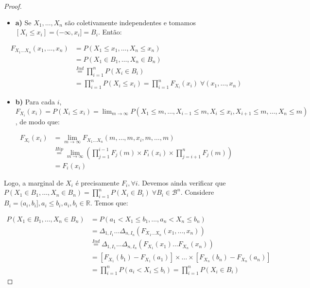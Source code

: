 \documentclass[
]{article}
\providecommand{\tightlist}{%
  \setlength{\itemsep}{0pt}\setlength{\parskip}{0pt}}
\theoremstyle{definition}
\theoremstyle{definition}
\theoremstyle{definition}
\theoremstyle{definition}
\theoremstyle{remark}
\begin{document}
\begin{proof}
\leavevmode

\begin{itemize}
\tightlist
\item
  \textbf{a)} Se \(X_{1},\ldots,X_{n}\) são coletivamente independentes e tomamos \([X_{i} \le x_{i}] = (-\infty, x_{i}] = B_{i}\). Então:
\end{itemize}

\begin{align*}
F_{X_{1} \ldots X_{n}}(x_{1},\ldots,x_{n}) &= P(X_{1} \le x_{1}, \ldots, X_{n} \le x_{n}) \\
&= P(X_{1} \in B_{1},\ldots, X_{n} \in B_{n}) \\
&\stackrel{Ind}{=} \prod_{i=1}^{n}P(X_{i} \in B_{i}) \\
&= \prod_{i=1}^{n}P(X_{i} \le x_{i}) = \prod_{i=1}^{n}F_{X_{i}}(x_{i}) \; \forall (x_{1},\ldots,x_{n})
\end{align*}

\begin{itemize}
\tightlist
\item
  \textbf{b)} Para cada \(i\), \(F_{X_{i}}(x_{i}) = P(X_{i} \le x_{i}) = \lim_{m \to \infty}P(X_{1} \le m, \ldots, X_{i-1} \le m, X_{i} \le x_{i}, X_{i+1} \le m, \ldots, X_{n} \le m)\), de modo que:
\end{itemize}

\begin{align*}
F_{X_{i}}(x_{i}) &= \lim_{m \to \infty}F_{X_{1}\ldots X_{n}}(m,\ldots,m,x_{i},m,\ldots,m) \\
&\stackrel{Hip}{=} \lim_{m \to \infty}\left(\prod_{j=1}^{i-1}F_{j}(m) \times F_{i}(x_{i}) \times \prod_{j=i+1}^{n}F_{j}(m)\right) \\
&= F_{i}(x_i)
\end{align*}

Logo, a marginal de \(X_{i}\) é precisamente \(F_{i}, \forall i\). Devemos ainda verificar que \(P(X_{1} \in B_{1}, \ldots, X_{n} \in B_{n}) = \prod_{i=1}^{n}P(X_{i} \in B_{i}) \; \forall B_{i} \in \mathcal{B}^{n}\). Considere \(B_{i} = (a_{i},b_{i}], a_{i} \le b_{i}, a_{i}, b_{i} \in \mathbb{R}\). Temos que:

\begin{align*}
P(X_{1} \in B_{1}, \ldots, X_{n} \in B_{n}) &= P(a_{1} < X_{1} \le b_{1}, \ldots, a_{n} < X_{n} \le b_{n}) \\
&= \Delta_{1,I_{1}} \ldots \Delta_{n,I_{n}}\left(F_{X_{1} \ldots X_{n}}(x_{1},\ldots,x_{n})\right) \\
&\stackrel{Ind}{=} \Delta_{1,I_{1}} \ldots \Delta_{n,I_{n}}(F_{X_{1}}(x_{1})\ldots F_{X_{n}}(x_{n})) \\
&= [F_{X_{1}}(b_{1}) - F_{X_{1}}(a_{1})] \times \ldots \times [F_{X_{n}}(b_{n}) - F_{X_{n}}(a_{n})] \\
&= \prod_{i=1}^{n}P(a_{i} < X_{i} \le b_{i}) = \prod_{i=1}^{n}P(X_{i} \in B_{i})
\end{align*}

\end{proof}
\end{document}
